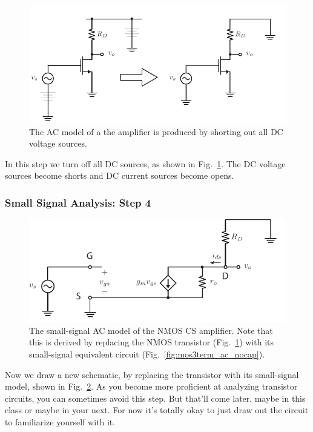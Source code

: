 \begin{figure}[tb]
\begin{center}
\includegraphics[scale=1]{cs_amp_ac}
\end{center}
\caption{The AC model of a the amplifier is produced by shorting out all DC voltage sources.} \label{fig:cs_amp_ac}
\end{figure}
 
In this step we turn off all DC sources, as shown in Fig.~\ref{fig:cs_amp_ac}.  The DC voltage sources become shorts and DC current sources become opens.

 


\subsubsection{Small Signal Analysis:  Step 4}

\begin{figure}[tb]
\begin{center}
\includegraphics[scale=1]{cs_amp_ss1}
\end{center}
\caption{The small-signal AC model of the NMOS CS amplifier. Note that this is derived by replacing the NMOS transistor (Fig.~\ref{fig:cs_amp_ac}) with its small-signal equivalent circuit (Fig.~\ref{fig:mos3term_ac_nocap}).} \label{fig:cs_amp_ss1}
\end{figure}

Now we draw a new schematic, by replacing the transistor with its small-signal model, shown in Fig.~\ref{fig:cs_amp_ss1}.  As you become more proficient at analyzing transistor circuits, you can sometimes avoid this step. But that'll come later, maybe in this class or maybe in your next.  For now it's totally okay to just draw out the circuit to familiarize yourself with it.

